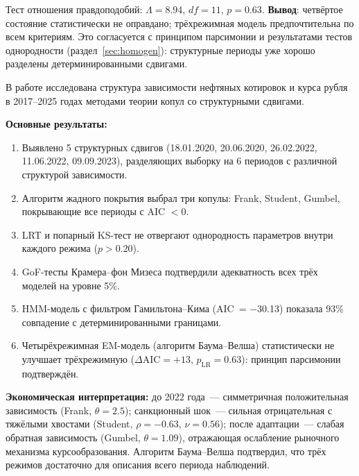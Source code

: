 Тест отношения правдоподобий: $\Lambda = 8.94$, $df = 11$, $p = 0.63$.
\textbf{Вывод}: четвёртое состояние статистически не оправдано;
трёхрежимная модель предпочтительна по всем критериям.
Это согласуется с принципом парсимонии и результатами тестов однородности
(раздел~\ref{sec:homogen}): структурные периоды уже хорошо разделены
детерминированными сдвигами.


\Conc

В работе исследована структура зависимости нефтяных котировок и курса
рубля в 2017--2025 годах методами теории копул со структурными сдвигами.

\textbf{Основные результаты:}
\begin{enumerate}
  \item Выявлено 5 структурных сдвигов (18.01.2020, 20.06.2020,
        26.02.2022, 11.06.2022, 09.09.2023), разделяющих выборку
        на 6 периодов с различной структурой зависимости.
  \item Алгоритм жадного покрытия выбрал три копулы: Frank, Student,
        Gumbel\textdegree, покрывающие все периоды с AIC $< 0$.
  \item LRT и попарный KS-тест не отвергают однородность параметров
        внутри каждого режима ($p > 0.20$).
  \item GoF-тесты Крамера--фон Мизеса подтвердили адекватность
        всех трёх моделей на уровне 5\%.
  \item HMM-модель с фильтром Гамильтона--Кима (AIC~= $-$30.13)
        показала 93\% совпадение с детерминированными границами.
  \item Четырёхрежимная EM-модель (алгоритм Баума--Велша) статистически
        не улучшает трёхрежимную ($\Delta\mathrm{AIC} = +13$,
        $p_{\mathrm{LR}} = 0.63$): принцип парсимонии подтверждён.
\end{enumerate}

\textbf{Экономическая интерпретация:}
до 2022 года~--- симметричная положительная зависимость (Frank, $\theta=2.5$);
санкционный шок~--- сильная отрицательная с тяжёлыми хвостами (Student,
$\rho=-0.63$, $\nu=0.56$); после адаптации~--- слабая обратная зависимость
(Gumbel\textdegree, $\theta=1.09$), отражающая ослабление рыночного
механизма курсообразования.
Алгоритм Баума--Велша подтвердил, что трёх режимов достаточно
для описания всего периода наблюдений.

\printbibliography[heading=bibintoc]


